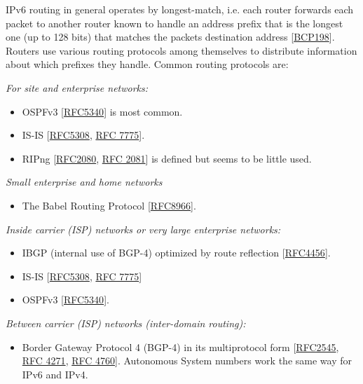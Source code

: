 \documentclass[
]{article}
\providecommand{\tightlist}{%
  \setlength{\itemsep}{0pt}\setlength{\parskip}{0pt}}
\begin{document}
IPv6 routing in general operates by longest-match, i.e. each router
forwards each packet to another router known to handle an address prefix
that is the longest one (up to 128 bits) that matches the
packet\textquotesingle s destination address
{[}\href{https://www.rfc-editor.org/info/bcp198}{BCP198}{]}. Routers use
various routing protocols among themselves to distribute information
about which prefixes they handle. Common routing protocols are:

\emph{For site and enterprise networks:}

\begin{itemize}
\item
  OSPFv3 {[}\href{https://www.rfc-editor.org/info/rfc5340}{RFC5340}{]}
  is most common.
\item
  IS-IS {[}\href{https://www.rfc-editor.org/info/rfc5308}{RFC5308},
  \href{https://www.rfc-editor.org/info/rfc7775}{RFC 7775}{]}.
\item
  RIPng {[}\href{https://www.rfc-editor.org/info/rfc2080}{RFC2080},
  \href{https://www.rfc-editor.org/info/rfc2081}{RFC 2081}{]} is defined
  but seems to be little used.
\end{itemize}

\emph{Small enterprise and home networks}

\begin{itemize}
\tightlist
\item
  The Babel Routing Protocol
  {[}\href{https://www.rfc-editor.org/info/rfc8966}{RFC8966}{]}.
\end{itemize}

\emph{Inside carrier (ISP) networks or very large enterprise networks:}

\begin{itemize}
\item
  IBGP (internal use of BGP-4) optimized by route reflection
  {[}\href{https://www.rfc-editor.org/info/rfc4456}{RFC4456}{]}.
\item
  IS-IS {[}\href{https://www.rfc-editor.org/info/rfc5308}{RFC5308},
  \href{https://www.rfc-editor.org/info/rfc7775}{RFC 7775}{]}
\item
  OSPFv3 {[}\href{https://www.rfc-editor.org/info/rfc5340}{RFC5340}{]}.
\end{itemize}

\emph{Between carrier (ISP) networks (inter-domain routing):}

\begin{itemize}
\tightlist
\item
  Border Gateway Protocol 4 (BGP-4) in its multiprotocol form
  {[}\href{https://www.rfc-editor.org/info/rfc2545}{RFC2545},
  \href{https://www.rfc-editor.org/info/rfc4271}{RFC 4271},
  \href{https://www.rfc-editor.org/info/rfc4760}{RFC 4760}{]}.
  Autonomous System numbers work the same way for IPv6 and IPv4.
\end{itemize}
\end{document}
